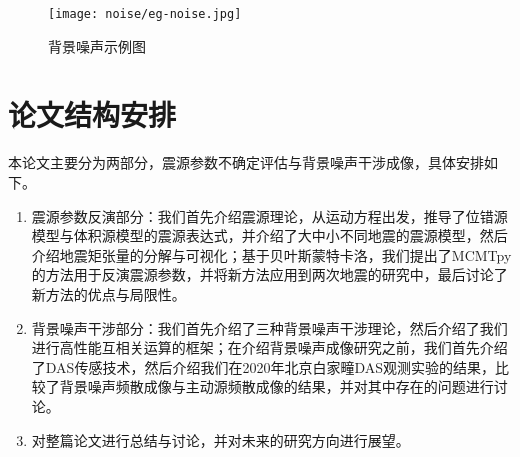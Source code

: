 \begin{figure}[h]
  \centering
  \texttt{[image: noise/eg-noise.jpg]}
  \caption{背景噪声示例图}
  \label{fig:eg-noise}
\end{figure}







\section{论文结构安排}

本论文主要分为两部分，震源参数不确定评估与背景噪声干涉成像，具体安排如下。
\begin{enumerate}
  \item 震源参数反演部分：我们首先介绍震源理论，从运动方程出发，推导了位错源模型与体积源模型的震源表达式，并介绍了大中小不同地震的震源模型，然后介绍地震矩张量的分解与可视化；基于贝叶斯蒙特卡洛，我们提出了MCMTpy的方法用于反演震源参数，并将新方法应用到两次地震的研究中，最后讨论了新方法的优点与局限性。
  \item 背景噪声干涉部分：我们首先介绍了三种背景噪声干涉理论，然后介绍了我们进行高性能互相关运算的框架；在介绍背景噪声成像研究之前，我们首先介绍了DAS传感技术，然后介绍我们在2020年北京白家疃DAS观测实验的结果，比较了背景噪声频散成像与主动源频散成像的结果，并对其中存在的问题进行讨论。
  \item 对整篇论文进行总结与讨论，并对未来的研究方向进行展望。
\end{enumerate}














